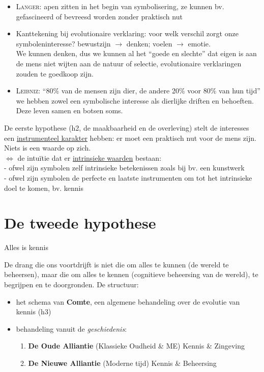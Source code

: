 \documentclass[11pt,a4paper]{article}
\begin{document}
\begin{itemize}
\item \textsc{Langer}: apen zitten in het begin van symbolisering, ze kunnen bv. gefascineerd of bevreesd worden zonder praktisch nut
\item Kanttekening bij evolutionaire verklaring: voor welk verschil zorgt onze symboleninteresse? bewustzijn $\rightarrow$ denken; voelen $\rightarrow$ emotie. \\ We kunnen denken, dus we kunnen al het ``goede en slechte'' dat eigen is aan de mens niet wijten aan de natuur of selectie, evolutionaire verklaringen zouden te goedkoop zijn.
\item \textsc{Leibniz}: ``80\% van de mensen zijn dier, de andere 20\% voor 80\% van hun tijd'' we hebben zowel een symbolische interesse als dierlijke driften en behoeften. Deze leven samen en botsen soms.

\end{itemize}
De eerste hypothese (h2, de maakbaarheid en de overleving) stelt de interesses een \underline{instrumenteel karakter} hebben: er moet een praktisch nut voor de mens zijn. Niets is een waarde op zich.
\\
$\Leftrightarrow$ de intu\"itie dat er \underline{intrinsieke waarden} bestaan: \\ - ofwel zijn symbolen zelf intrinsieke betekenissen zoals bij bv. een kunstwerk \\ - ofwel zijn symbolen de perfecte en laatste instrumenten om tot het intrinsieke doel te komen, bv. kennis
\section{De tweede hypothese}
\begin{center}
\begin{huge}
Alles is kennis
\end{huge}
\end{center}
De drang die ons voortdrijft is niet die om alles te kunnen (de wereld te beheersen), maar die om alles te kennen (cognitieve beheersing van de wereld), te begrijpen en te doorgronden. De structuur:
\begin{itemize}
\item het schema van \textbf{Comte}, een algemene behandeling over de evolutie van kennis (h3)
\item behandeling vanuit de \emph{geschiedenis}:
	\begin{enumerate}
	\item \textbf{De Oude Alliantie} (Klassieke Oudheid \& ME) Kennis \& Zingeving 
	\item \textbf{De Nieuwe Alliantie} (Moderne tijd) Kennis \& Beheersing
	\end{enumerate}
	
\end{itemize}
\end{document}
